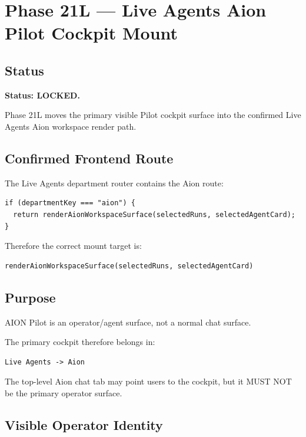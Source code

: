 \section{Phase 21L --- Live Agents Aion Pilot Cockpit Mount}
\label{sec:aion-phase21l-live-agents-aion-pilot-mount}

\subsection{Status}

\textbf{Status: LOCKED.}

Phase 21L moves the primary visible Pilot cockpit surface into the confirmed Live Agents Aion workspace render path.

\subsection{Confirmed Frontend Route}

The Live Agents department router contains the Aion route:

\begin{verbatim}
if (departmentKey === "aion") {
  return renderAionWorkspaceSurface(selectedRuns, selectedAgentCard);
}
\end{verbatim}

Therefore the correct mount target is:

\begin{verbatim}
renderAionWorkspaceSurface(selectedRuns, selectedAgentCard)
\end{verbatim}

\subsection{Purpose}

AION Pilot is an operator/agent surface, not a normal chat surface.

The primary cockpit therefore belongs in:

\begin{verbatim}
Live Agents -> Aion
\end{verbatim}

The top-level Aion chat tab may point users to the cockpit, but it MUST NOT be the primary operator surface.

\subsection{Visible Operator Identity}

